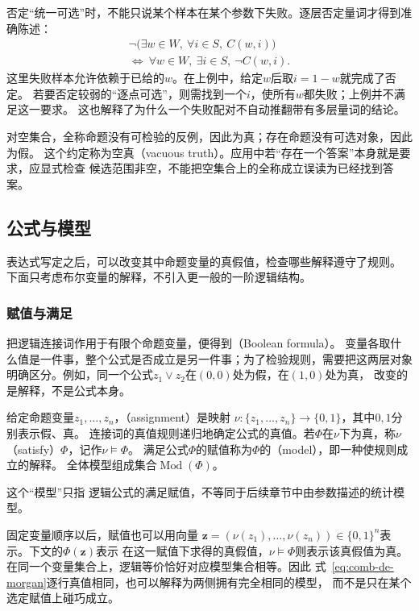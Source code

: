 否定“统一可选”时，不能只说某个样本在某个参数下失败。逐层否定量词才得到准确陈述：
\[
  \begin{gathered}
    \neg\bigl(\exists w\in W,\ \forall i\in S,\ C(w,i)\bigr)\\
    \Longleftrightarrow\
    \forall w\in W,\ \exists i\in S,\ \neg C(w,i).
  \end{gathered}
\]
这里失败样本允许依赖于已给的$w$。在上例中，给定$w$后取$i=1-w$就完成了否定。
若要否定较弱的“逐点可选”，则需找到一个$i$，使所有$w$都失败；上例并不满足这一要求。
这也解释了为什么一个失败配对不自动推翻带有多层量词的结论。

对空集合，全称命题没有可检验的反例，因此为真；存在命题没有可选对象，因此为假。
这个约定称为空真（vacuous truth）。应用中若“存在一个答案”本身就是要求，应显式检查
候选范围非空，不能把空集合上的全称成立误读为已经找到答案。

\subsection{公式与模型}
\label{sec:prelim-formulas-models}

表达式写定之后，可以改变其中命题变量的真假值，检查哪些解释遵守了规则。
下面只考虑布尔变量的解释，不引入更一般的一阶逻辑结构。

\subsubsection{赋值与满足}
\label{sec:prelim-assignment-satisfaction}

把逻辑连接词作用于有限个命题变量，便得到（Boolean formula）。
变量各取什么值是一件事，整个公式是否成立是另一件事；为了检验规则，需要把这两层对象
明确区分。例如，同一个公式$z_1\lor z_2$在$(0,0)$处为假，在$(1,0)$处为真，
改变的是解释，不是公式本身。

\begin{definition}[赋值与公式的模型]
\label{def:comb-assignment-model}
给定命题变量$z_1,\ldots,z_n$，（assignment）是映射
$\nu:\{z_1,\ldots,z_n\}\to\{0,1\}$，其中$0,1$分别表示假、真。
连接词的真值规则递归地确定公式的真值。若$\Phi$在$\nu$下为真，称$\nu$
（satisfy）$\Phi$，记作$\nu\models\Phi$。
满足公式$\Phi$的赋值称为$\Phi$的（model），即一种使规则成立的解释。
全体模型组成集合$\operatorname{Mod}(\Phi)$。
\end{definition}
这个“模型”只指
逻辑公式的满足赋值，不等同于后续章节中由参数描述的统计模型。

固定变量顺序以后，赋值也可以用向量
$\bm{z}=(\nu(z_1),\ldots,\nu(z_n))\in\{0,1\}^n$表示。下文的$\Phi(\bm{z})$表示
在这一赋值下求得的真假值，$\nu\models\Phi$则表示该真假值为真。
在同一个变量集合上，逻辑等价恰好对应模型集合相等。因此
式~\eqref{eq:comb-de-morgan}逐行真值相同，也可以解释为两侧拥有完全相同的模型，
而不是只在某个选定赋值上碰巧成立。

